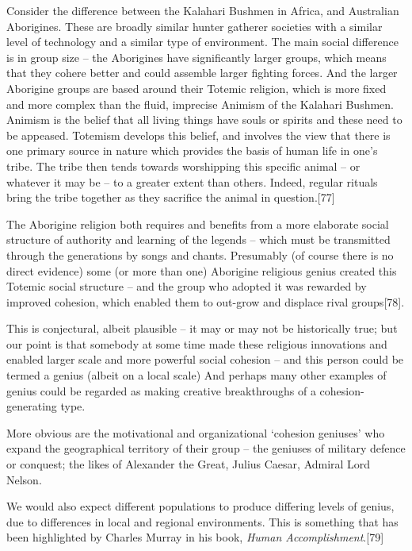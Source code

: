 \documentclass[
]{book}
\begin{document}
Consider the difference between the Kalahari Bushmen in Africa, and Australian Aborigines. These are broadly similar hunter gatherer societies with a similar level of technology and a similar type of environment. The main social difference is in group size -- the Aborigines have significantly larger groups, which means that they cohere better and could assemble larger fighting forces. And the larger Aborigine groups are based around their Totemic religion, which is more fixed and more complex than the fluid, imprecise Animism of the Kalahari Bushmen. Animism is the belief that all living things have souls or spirits and these need to be appeased. Totemism develops this belief, and involves the view that there is one primary source in nature which provides the basis of human life in one's tribe. The tribe then tends towards worshipping this specific animal -- or whatever it may be -- to a greater extent than others. Indeed, regular rituals bring the tribe together as they sacrifice the animal in question.{[}77{]}

The Aborigine religion both requires and benefits from a more elaborate social structure of authority and learning of the legends -- which must be transmitted through the generations by songs and chants. Presumably (of course there is no direct evidence) some (or more than one) Aborigine religious genius created this Totemic social structure -- and the group who adopted it was rewarded by improved cohesion, which enabled them to out-grow and displace rival groups{[}78{]}.

This is conjectural, albeit plausible -- it may or may not be historically true; but our point is that somebody at some time made these religious innovations and enabled larger scale and more powerful social cohesion -- and this person could be termed a genius (albeit on a local scale) And perhaps many other examples of genius could be regarded as making creative breakthroughs of a cohesion-generating type.

More obvious are the motivational and organizational `cohesion geniuses' who expand the geographical territory of their group -- the geniuses of military defence or conquest; the likes of Alexander the Great, Julius Caesar, Admiral Lord Nelson.

We would also expect different populations to produce differing levels of genius, due to differences in local and regional environments. This is something that has been highlighted by Charles Murray in his book, \emph{Human Accomplishment}.{[}79{]}
\end{document}
